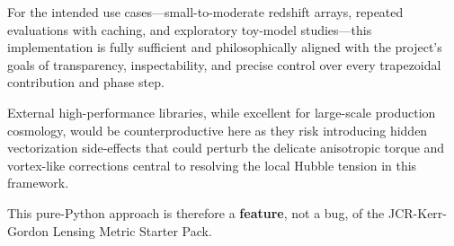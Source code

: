 For the intended use cases---small-to-moderate redshift arrays, repeated evaluations with caching, and exploratory toy-model studies---this implementation is fully sufficient and philosophically aligned with the project's goals of transparency, inspectability, and precise control over every trapezoidal contribution and phase step.

External high-performance libraries, while excellent for large-scale production cosmology, would be counterproductive here as they risk introducing hidden vectorization side-effects that could perturb the delicate anisotropic torque and vortex-like corrections central to resolving the local Hubble tension in this framework.

\bigskip
This pure-Python approach is therefore a \textbf{feature}, not a bug, of the JCR-Kerr-Gordon Lensing Metric Starter Pack.
